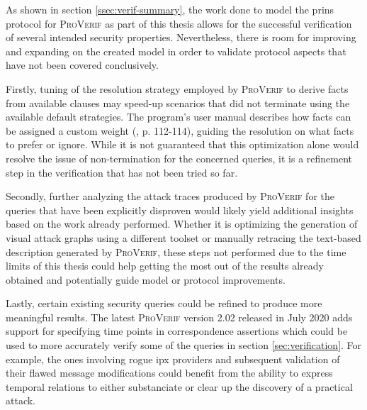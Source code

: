 As shown in section \ref{ssec:verif-summary}, the work done to model the \gls{prins} protocol for \textsc{ProVerif} as part of this thesis allows for the successful verification of several intended security properties.
Nevertheless, there is room for improving and expanding on the created model in order to validate protocol aspects that have not been covered conclusively.

Firstly, tuning of the resolution strategy employed by \textsc{ProVerif} to derive facts from available clauses may speed-up scenarios that did not terminate using the available default strategies.
The program's user manual describes how facts can be assigned a custom weight (\cite{blanchet2020proverif}, p. 112-114), guiding the resolution on what facts to prefer or ignore.
While it is not guaranteed that this optimization alone would resolve the issue of non-termination for the concerned queries, it is a refinement step in the verification that has not been tried so far.

Secondly, further analyzing the attack traces produced by \textsc{ProVerif} for the queries that have been explicitly disproven would likely yield additional insights based on the work already performed.
Whether it is optimizing the generation of visual attack graphs using a different toolset or manually retracing the text-based description generated by \textsc{ProVerif}, these steps not performed due to the time limits of this thesis could help getting the most out of the results already obtained and potentially guide model or protocol improvements.

Lastly, certain existing security queries could be refined to produce more meaningful results.
The latest \textsc{ProVerif} version 2.02 released in July 2020 adds support for specifying time points in correspondence assertions which could be used to more accurately verify some of the queries in section \ref{sec:verification}.
For example, the ones involving rogue \gls{ipx} providers and subsequent validation of their flawed message modifications could benefit from the ability to express temporal relations to either substanciate or clear up the discovery of a practical attack.